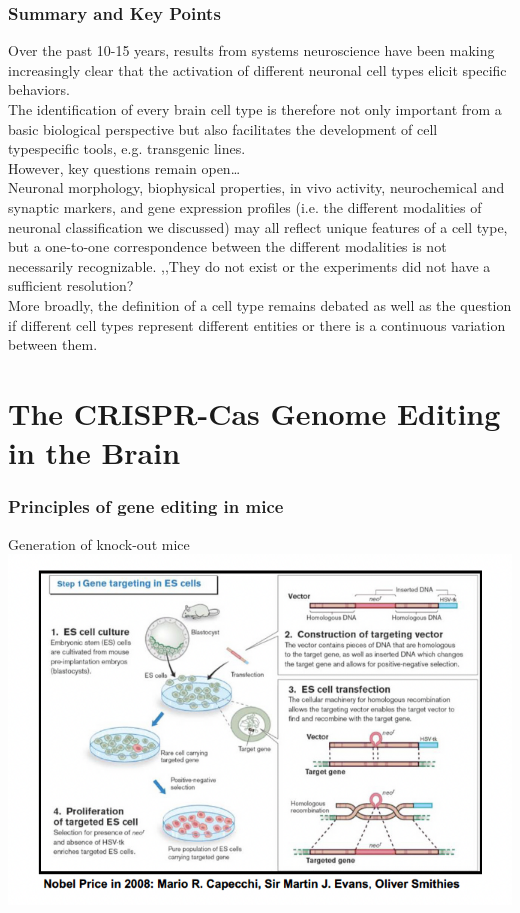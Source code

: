 \begin{itemize}
\begin{itemize}
\subsubsection{Summary and Key Points}Over the past 10-15 years, results from systems neuroscience have been making
increasingly clear that the activation of different neuronal cell types elicit specific behaviors.
\\The identification of every brain cell type is therefore not only important from a basic biological perspective but also facilitates the development of cell typespecific tools, e.g. transgenic lines.
\\However, key questions remain open…
\\Neuronal morphology, biophysical properties, in vivo activity, neurochemical and synaptic markers, and gene expression profiles (i.e. the different modalities of neuronal classification we discussed) may all reflect unique features of a cell type, but a one-to-one correspondence between the different modalities is not necessarily recognizable. 
,,They do not exist or the experiments did not have a sufficient resolution?
\\More broadly, the definition of a cell type remains debated as well as the question
if different cell types represent different entities or there is a continuous variation
between them.

\section{The CRISPR-Cas Genome Editing in the Brain}
\subsubsection{Principles of gene editing in mice}
Generation of knock-out mice
\\
\includegraphics[width=1\textwidth]{Images/GeneEditinginMice.png}\\[1cm]

\end{itemize}
\end{itemize}
